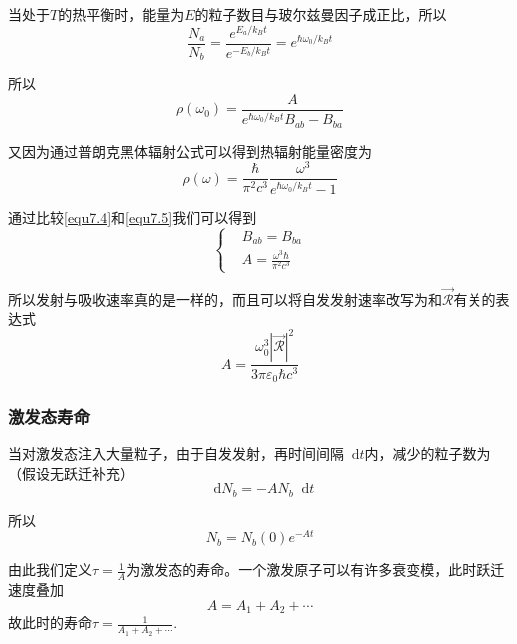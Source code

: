 \documentclass[UTF8]{ctexart}
\newcommand*{\dif}{\mathop{}\!\mathrm{d}}
\begin{document}
\noindent 当处于$T$的热平衡时，能量为$E$的粒子数目与玻尔兹曼因子成正比，所以
\begin{equation}
    \frac{N_a}{N_b} = \frac{e^{E_a/k_B t}}{e^{-E_b/k_B t}} = e^{\hbar \omega_0/k_B t}
\end{equation}

\noindent 所以
\begin{equation}
    \rho(\omega_0) = \frac{A}{ e^{\hbar \omega_0/k_B t} B_{ab} - B_{ba}} \label{equ7.4}
\end{equation}

    又因为通过普朗克黑体辐射公式可以得到热辐射能量密度为
    \begin{equation}
        \rho(\omega) = \frac{\hbar}{\pi^2 c^3} \frac{\omega^3}{e^{\hbar \omega_0/k_B t}-1}\label{equ7.5}
    \end{equation}

\noindent 通过比较\autoref{equ7.4}和\autoref{equ7.5}我们可以得到
\begin{equation}
    \left\{\begin{aligned}
        &B_{ab} = B_{ba} \\ 
        &A = \frac{\omega^3 \hbar }{\pi^2 c^3}
    \end{aligned}\right.
\end{equation}

\noindent 所以发射与吸收速率真的是一样的，而且可以将自发发射速率改写为和$\vec{\mathcal{R}}$有关的表达式
\begin{equation}
    A = \frac{\omega_0^3 |\vec{\mathcal{R}}|^2}{3 \pi \varepsilon_0 \hbar c^3}\label{equ7.6}
\end{equation}

    \subsubsection{激发态寿命}
    当对激发态注入大量粒子，由于自发发射，再时间间隔$\dif t$内，减少的粒子数为（假设无跃迁补充）
    \begin{equation}
        \dif N_b = - A N_b \dif t
    \end{equation}

\noindent 所以 
\begin{equation}
    N_b = N_b(0) e^{-At}
\end{equation}

\noindent 由此我们定义$\tau = \frac{1}{A}$为激发态的寿命。一个激发原子可以有许多衰变模，此时跃迁速度叠加
\begin{equation}
    A= A_1 + A_2 + \cdots 
\end{equation}
\noindent 故此时的寿命$\tau = \frac{1}{A_1 +A_2 + \cdots}$.
\end{document}
